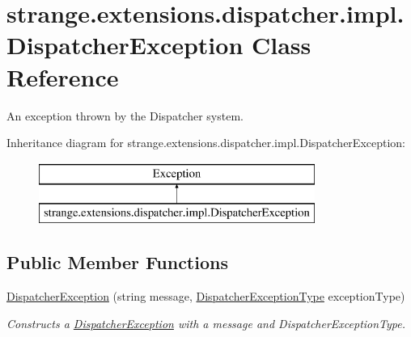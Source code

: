 \hypertarget{classstrange_1_1extensions_1_1dispatcher_1_1impl_1_1_dispatcher_exception}{\section{strange.\-extensions.\-dispatcher.\-impl.\-Dispatcher\-Exception Class Reference}
\label{classstrange_1_1extensions_1_1dispatcher_1_1impl_1_1_dispatcher_exception}
}


An exception thrown by the Dispatcher system.  


Inheritance diagram for strange.\-extensions.\-dispatcher.\-impl.\-Dispatcher\-Exception\-:\begin{figure}[H]
\begin{center}
\leavevmode
\includegraphics[height=2.000000cm]{classstrange_1_1extensions_1_1dispatcher_1_1impl_1_1_dispatcher_exception}
\end{center}
\end{figure}
\subsection*{Public Member Functions}
\begin{DoxyCompactItemize}
\item 
\hypertarget{classstrange_1_1extensions_1_1dispatcher_1_1impl_1_1_dispatcher_exception_a4e1966d8a7ae6caf398689c29fd06b98}{\hyperlink{classstrange_1_1extensions_1_1dispatcher_1_1impl_1_1_dispatcher_exception_a4e1966d8a7ae6caf398689c29fd06b98}{Dispatcher\-Exception} (string message, \hyperlink{namespacestrange_1_1extensions_1_1dispatcher_1_1api_a03ba459ad62cc042c88405d9419eb4c6}{Dispatcher\-Exception\-Type} exception\-Type)}\label{classstrange_1_1extensions_1_1dispatcher_1_1impl_1_1_dispatcher_exception_a4e1966d8a7ae6caf398689c29fd06b98}

\begin{DoxyCompactList}\small\item\em Constructs a \hyperlink{classstrange_1_1extensions_1_1dispatcher_1_1impl_1_1_dispatcher_exception}{Dispatcher\-Exception} with a message and Dispatcher\-Exception\-Type. \end{DoxyCompactList}\end{DoxyCompactItemize}
